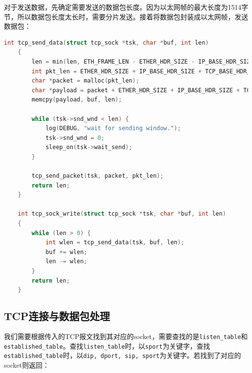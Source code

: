 \documentclass[UTF8]{report}
\begin{document}
对于发送数据，先确定需要发送的数据包长度。因为以太网帧的最大长度为1514字节，所以数据包长度太长时，需要分片发送。接着将数据包封装成以太网帧，发送数据包：

\begin{lstlisting}[language=C]
    int tcp_send_data(struct tcp_sock *tsk, char *buf, int len)
    {
        len = min(len, ETH_FRAME_LEN - ETHER_HDR_SIZE - IP_BASE_HDR_SIZE - TCP_BASE_HDR_SIZE);
        int pkt_len = ETHER_HDR_SIZE + IP_BASE_HDR_SIZE + TCP_BASE_HDR_SIZE + len;
        char *packet = malloc(pkt_len);
        char *payload = packet + ETHER_HDR_SIZE + IP_BASE_HDR_SIZE + TCP_BASE_HDR_SIZE;
        memcpy(payload, buf, len);
    
        while (tsk->snd_wnd < len) {
            log(DEBUG, "wait for sending window.");
            tsk->snd_wnd = 0;
            sleep_on(tsk->wait_send);
        }
    
        tcp_send_packet(tsk, packet, pkt_len);
        return len;
    }
    
    int tcp_sock_write(struct tcp_sock *tsk, char *buf, int len)
    {
        while (len > 0) {
            int wlen = tcp_send_data(tsk, buf, len);
            buf += wlen;
            len -= wlen;
        }
        return len;
    }
\end{lstlisting}

\subsection{TCP连接与数据包处理}

我们需要根据传入的TCP报文找到其对应的socket，需要查找的是\texttt{listen_table}和\texttt{established_table}。查找\texttt{listen_table}时，以\texttt{sport}为关键字，查找\texttt{established_table}时，以\texttt{dip, dport, sip, sport}为关键字。若找到了对应的socket则返回：
\end{document}
